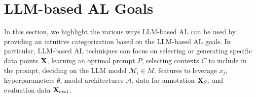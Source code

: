 
\section{LLM-based AL Goals}\label{app:al_setting}

In this section, we highlight the various ways LLM-based AL can be used by providing an intuitive categorization based on the LLM-based AL goals.
In particular, LLM-based AL techniques can focus on 
selecting or generating specific data points $\boldsymbol{\mathrm{X}}$,
learning an optimal prompt $P$,
selecting contexts $C$ to include in the prompt,
deciding on the LLM model $\mathcal{M}_i \in M$,
features to leverage $x_j$,
hyperparameters $\theta$,
model architectures $\mathcal{A}$,
data for annotation $\boldsymbol{\mathrm{X}}_{S}$,
and
evaluation data $\boldsymbol{\mathrm{X}}_{\rm eval}$.



